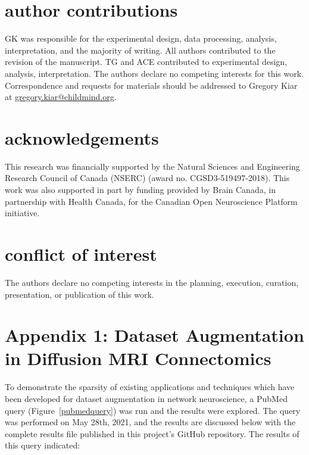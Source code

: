 \documentclass[num-refs]{nbdt-article}
\begin{document}
\section*{author contributions}
GK was responsible for the experimental design, data processing, analysis, interpretation, and the majority of writing. All authors contributed to the revision of the manuscript. TG and ACE contributed to experimental design, analysis, interpretation. The authors declare no competing interests for this work. Correspondence and requests for materials should be addressed to Gregory Kiar at \url{gregory.kiar@childmind.org}.


\section*{acknowledgements}
This research was financially supported by the Natural Sciences and Engineering Research Council of Canada (NSERC) (award no. CGSD3-519497-2018). This work was also supported in part by funding provided by Brain Canada, in partnership with Health Canada, for the Canadian Open Neuroscience Platform initiative.

\section*{conflict of interest}
The authors declare no competing interests in the planning, execution, curation, presentation, or publication of this work.



\clearpage
\onecolumn
\section*{Appendix 1: Dataset Augmentation in Diffusion MRI Connectomics}
\label{app:augmentation}

To demonstrate the sparsity of existing applications and techniques which have been developed for dataset augmentation in network neuroscience, a PubMed query (Figure~\ref{pubmedquery}) was run and the results were explored. The query was performed on May 28th, 2021, and the results are discussed below with the complete results file published in this project's GitHub repository. The results of this query indicated:
\end{document}
